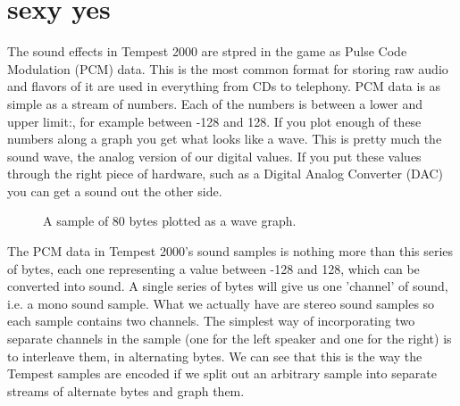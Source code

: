 \chapter{sexy yes}
\lhead[tempest 2000]{}
\label{sec:sexy_yes}
\lstset{style=68KStyle}

The sound effects in Tempest 2000 are stpred in the game as Pulse Code Modulation (PCM) data. This is the most common format for storing
raw audio and flavors of it are used in everything from CDs to telephony. PCM data is as simple as a stream of numbers. Each of the numbers
is between a lower and upper limit:, for example between -128 and 128. If you plot enough of these numbers along a graph you get what looks like
a wave. This is pretty much the sound wave, the analog version of our digital values. If you put these values through the right piece of hardware,
such as a Digital Analog Converter (DAC) you can get a sound out the other side.

\begin{figure}[H]
    \centering
    \begin{adjustbox}{width=7cm,center}
    \end{adjustbox}
  \caption{A sample of 80 bytes plotted as a wave graph.}
\end{figure}

The PCM data in Tempest 2000's sound samples is nothing more than this series of bytes, each one representing a value between -128 and 128, which can
be converted into sound. A single series of bytes will give us one 'channel' of sound, i.e. a mono sound sample. What we actually have are stereo
sound samples so each sample contains two channels. The simplest way of incorporating two separate channels in the sample (one for the left speaker
and one for the right) is to interleave them, in alternating bytes. We can see that this is the way the Tempest samples are encoded if we split out
an arbitrary sample into separate streams of alternate bytes and graph them.

